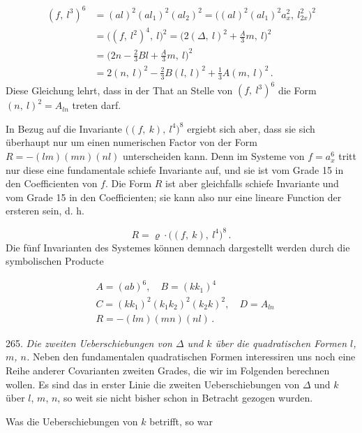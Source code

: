 \[
\begin{aligned}
(f,\ l^3)^6 &= (al)^2(al_1)^2(al_2)^2 = \big((al)^2(al_1)^2a_x^2,\ l_{2x}^2\big)^2\\
&= \big((f,\ l^2)^4,\ l\big)^2 = \Big(2(\Delta,\ l)^2+\frac{A}{3}m,\ l\Big)^2\\
&= \Big(2n-\frac{2}{3}Bl+\frac{A}{3}m,\ l\Big)^2\\
&= 2(n,\ l)^2-\frac{2}{3}B(l,\ l)^2+\frac{1}{3}A(m,\ l)^2\,.
\end{aligned}
\]
Diese Gleichung lehrt, dass in der That an Stelle von $(f,\ l^3)^6$ die Form
$(n,\ l)^2 = A_{ln}$ treten darf.

In Bezug auf die Invariante $\big((f,\ k),\ l^4\big)^8$ ergiebt sich aber, dass
sie sich überhaupt nur um einen numerischen Factor von der Form
$R=-(lm)(mn)(nl)$ unterscheiden kann. Denn im Systeme von $f=a_x^6$ tritt nur
diese eine fundamentale schiefe Invariante auf, und sie ist vom Grade 15 in
den Coefficienten von $f$. Die Form $R$ ist aber gleichfalls schiefe Invariante
und vom Grade 15 in den Coefficienten; sie kann also nur eine lineare Function
der ersteren sein, d. h.

\[
R = \varrho\cdot\big((f,\ k),\ l^4\big)^8\,.
\]
Die fünf Invarianten des Systemes können demnach dargestellt werden durch die
symbolischen Producte

\[
\begin{aligned}
&A=(ab)^6,\quad B=(kk_1)^4\\
&C=(kk_1)^2(k_1k_2)^2(k_2k)^2,\quad D=A_{ln}\\
&R=-(lm)(mn)(nl)\,.
\end{aligned}
\]

265. \textit{Die zweiten Ueberschiebungen von $\Delta$ und $k$ über die
quadratischen Formen $l$, $m$, $n$.} Neben den fundamentalen quadratischen
Formen interessiren uns noch eine Reihe anderer Covarianten zweiten Grades,
die wir im Folgenden berechnen wollen. Es sind das in erster Linie die
zweiten Ueberschiebungen von $\Delta$ und $k$ über $l$, $m$, $n$, so weit sie
nicht bisher schon in Betracht gezogen wurden.

Was die Ueberschiebungen von $k$ betrifft, so war




